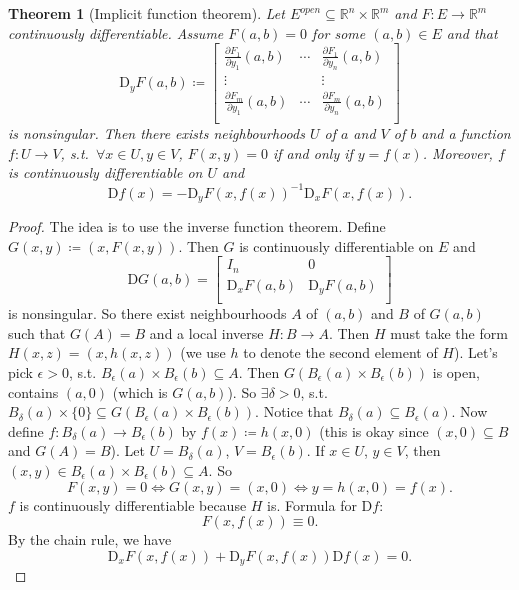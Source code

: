 \documentclass[12pt]{article}
\theoremstyle{plain}
\newtheorem{thm}{Theorem}
\theoremstyle{definition}
\begin{document}
\begin{thm}[Implicit function theorem]
    Let $E^{open}\subseteq \mathbb{R}^n\times \mathbb{R}^m$ and $F:E\rightarrow\mathbb{R}^m$ continuously differentiable.
    Assume $F(a,b) = 0$ for some $(a,b)\in E$ and that
    \[
        \mathrm{D}_y F(a,b)\coloneqq
        \begin{bmatrix}
            \frac{\partial F_1}{\partial y_1}(a,b)&\cdots&\frac{\partial F_1}{\partial y_n}(a,b)\\
            \vdots&&\vdots\\
            \frac{\partial F_m}{\partial y_1}(a,b)&\cdots&\frac{\partial F_m}{\partial y_n}(a,b)\\
        \end{bmatrix}
    \]
    is nonsingular.
    Then there exists neighbourhoods $U$ of $a$ and $V$ of $b$ and a function $f:U\rightarrow V$, s.t.\ $\forall x\in U, y\in V$, $F(x,y) = 0$ if and
    only if $y=f(x)$.
    Moreover, $f$ is continuously differentiable on $U$ and
    \[
        \mathrm{D}f(x) = -\mathrm{D}_yF(x,f(x))^{-1}\mathrm{D}_xF(x,f(x)).
    \]
\end{thm}
\begin{proof}
    The idea is to use the inverse function theorem.
    Define $G(x,y) \coloneqq (x,F(x,y))$.
    Then $G$ is continuously differentiable on $E$ and
    \[
        \mathrm{D}G(a,b)=\begin{bmatrix}
            I_n & 0\\
            \mathrm{D}_xF(a,b)&\mathrm{D}_y F(a,b)\\
        \end{bmatrix}
    \]
    is nonsingular.
    So there exist neighbourhoods $A$ of $(a,b)$ and $B$ of $G(a,b)$ such that 
    $G(A) = B$ and a local inverse $H:B\rightarrow A$.
    Then $H$ must take the form
    $H(x,z) = (x,h(x,z))$ (we use $h$ to denote the second element of $H$).
    Let's pick $\epsilon>0$, s.t. $B_\epsilon(a)\times B_\epsilon(b)\subseteq A$.
    Then $G(B_\epsilon(a)\times B_\epsilon(b))$ is open, contains $(a,0)$ (which is $G(a,b)$).
    So $\exists \delta>0$, s.t.\ $B_\delta(a)\times\{0\}\subseteq G(B_\epsilon(a)\times B_\epsilon(b))$.
    Notice that $B_\delta(a)\subseteq B_\epsilon(a)$.
    Now define $f:B_\delta(a)\rightarrow B_\epsilon(b)$ by $f(x)\coloneqq h(x,0)$ (this is okay since $(x,0)\subseteq B$ and $G(A)=B$).
    Let $U=B_\delta (a)$, $V=B_\epsilon(b)$.
    If $x\in U$, $y\in V$, then $(x,y)\in B_\epsilon(a)\times B_\epsilon(b)\subseteq A$.
    So 
    \[
        F(x,y) = 0\Longleftrightarrow G(x,y) = (x,0) \Longleftrightarrow y=h(x,0)=f(x).
    \]
    $f$ is continuously differentiable because $H$ is.
    Formula for $\mathrm{D}f$:
    \[
        F(x,f(x)) \equiv 0.
    \]
    By the chain rule, we have
    \[
        \mathrm{D}_x F(x,f(x)) + \mathrm{D}_y F(x,f(x))\mathrm{D}f(x) = 0.
    \]
\end{proof}
\end{document}

